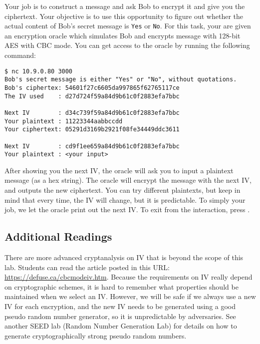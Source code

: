 Your job is to construct a message and ask Bob to encrypt it
and give you the ciphertext.
Your objective is to use this opportunity to figure out
whether the actual content of Bob's secret message is \texttt{Yes} or \texttt{No}.
For this task, your are given an encryption oracle
which simulates Bob and encrypts message with 128-bit AES with CBC mode.
You can get access to the oracle by running the following command:

\begin{lstlisting}
$ nc 10.9.0.80 3000
Bob's secret message is either "Yes" or "No", without quotations.
Bob's ciphertex: 54601f27c6605da997865f62765117ce
The IV used    : d27d724f59a84d9b61c0f2883efa7bbc

Next IV        : d34c739f59a84d9b61c0f2883efa7bbc
Your plaintext : 11223344aabbccdd
Your ciphertext: 05291d3169b2921f08fe34449ddc3611

Next IV        : cd9f1ee659a84d9b61c0f2883efa7bbc
Your plaintext : <your input>
\end{lstlisting}

After showing you the next IV, 
the oracle will ask you to input a plaintext message (as a hex string).
The oracle will encrypt the message with the next IV, 
and outputs the new ciphertext.
You can try different plaintexts, but keep in mind that every time, the 
IV will change, but it is predictable. To simply your job, we let the 
oracle print out the next IV. To exit from the interaction, press .


\subsection{Additional Readings}

There are more advanced cryptanalysis on IV that is beyond the scope of this lab. Students
can read the article posted in this URL: \url{https://defuse.ca/cbcmodeiv.htm}.
Because the requirements on IV really depend on cryptographic schemes, it is hard to
remember what properties should be maintained when we select an IV.
However, we will be safe if we always use a new IV for each encryption, and the
new IV needs to be generated using a good pseudo random number
generator, so it is unpredictable by adversaries.
See another SEED lab (Random Number Generation Lab) for
details on how to generate cryptographically strong pseudo random numbers.

